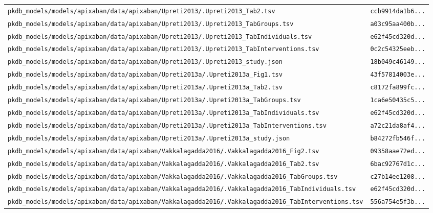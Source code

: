 \begin{longtable}{ll}
\texttt{pkdb\_models/models/apixaban/data/apixaban/Upreti2013/.Upreti2013\_Tab2.tsv} & \texttt{ccb9914da1b6...} \\
\texttt{pkdb\_models/models/apixaban/data/apixaban/Upreti2013/.Upreti2013\_TabGroups.tsv} & \texttt{a03c95aa400b...} \\
\texttt{pkdb\_models/models/apixaban/data/apixaban/Upreti2013/.Upreti2013\_TabIndividuals.tsv} & \texttt{e62f45cd320d...} \\
\texttt{pkdb\_models/models/apixaban/data/apixaban/Upreti2013/.Upreti2013\_TabInterventions.tsv} & \texttt{0c2c54325eeb...} \\
\texttt{pkdb\_models/models/apixaban/data/apixaban/Upreti2013/.Upreti2013\_study.json} & \texttt{18b049c46149...} \\
\texttt{pkdb\_models/models/apixaban/data/apixaban/Upreti2013a/.Upreti2013a\_Fig1.tsv} & \texttt{43f57814003e...} \\
\texttt{pkdb\_models/models/apixaban/data/apixaban/Upreti2013a/.Upreti2013a\_Tab2.tsv} & \texttt{c8172fa899fc...} \\
\texttt{pkdb\_models/models/apixaban/data/apixaban/Upreti2013a/.Upreti2013a\_TabGroups.tsv} & \texttt{1ca6e50435c5...} \\
\texttt{pkdb\_models/models/apixaban/data/apixaban/Upreti2013a/.Upreti2013a\_TabIndividuals.tsv} & \texttt{e62f45cd320d...} \\
\texttt{pkdb\_models/models/apixaban/data/apixaban/Upreti2013a/.Upreti2013a\_TabInterventions.tsv} & \texttt{a72c21da8af4...} \\
\texttt{pkdb\_models/models/apixaban/data/apixaban/Upreti2013a/.Upreti2013a\_study.json} & \texttt{b84272fb546f...} \\
\texttt{pkdb\_models/models/apixaban/data/apixaban/Vakkalagadda2016/.Vakkalagadda2016\_Fig2.tsv} & \texttt{09358aae72ed...} \\
\texttt{pkdb\_models/models/apixaban/data/apixaban/Vakkalagadda2016/.Vakkalagadda2016\_Tab2.tsv} & \texttt{6bac92767d1c...} \\
\texttt{pkdb\_models/models/apixaban/data/apixaban/Vakkalagadda2016/.Vakkalagadda2016\_TabGroups.tsv} & \texttt{c27b14ee1208...} \\
\texttt{pkdb\_models/models/apixaban/data/apixaban/Vakkalagadda2016/.Vakkalagadda2016\_TabIndividuals.tsv} & \texttt{e62f45cd320d...} \\
\texttt{pkdb\_models/models/apixaban/data/apixaban/Vakkalagadda2016/.Vakkalagadda2016\_TabInterventions.tsv} & \texttt{556a754e5f3b...} \\

\end{longtable}
